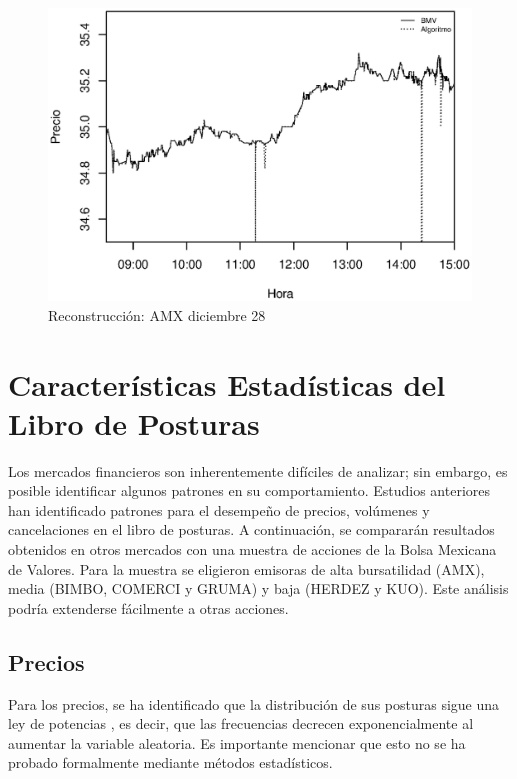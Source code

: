 \documentclass[11pt]{article}
\numberwithin{equation}{section} %
\begin{document}
\begin{figure}[htbp] \centering
\includegraphics[scale=0.75, trim=0 0.5cm 0 1.5cm]{amx122810.eps}
\caption{Reconstrucción: AMX diciembre 28}
\label{amx1228}
\end{figure}

\clearpage

\section{Características Estadísticas del Libro de Posturas}

Los mercados financieros son inherentemente difíciles de analizar; sin embargo, es posible identificar algunos patrones en su comportamiento. Estudios anteriores han identificado patrones para el desempeño de precios, volúmenes y cancelaciones en el libro de posturas. A continuación, se compararán resultados obtenidos en otros mercados con una muestra de acciones de la Bolsa Mexicana de Valores. Para la muestra se eligieron emisoras de alta bursatilidad (AMX), media (BIMBO, COMERCI y GRUMA) y baja (HERDEZ y KUO). Este análisis podría extenderse fácilmente a otras acciones.\\

\subsection{Precios}

Para los precios, se ha identificado que la distribución de sus posturas sigue una ley de potencias \cite{Bouchaud2002}, es decir, que las frecuencias decrecen exponencialmente al aumentar la variable aleatoria. Es importante mencionar que esto no se ha probado formalmente mediante métodos estadísticos.\\
\end{document}
